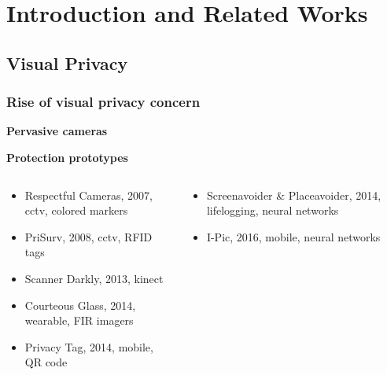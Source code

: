\section{Introduction and Related Works}

\subsection{Visual Privacy}
\begin{frame}[t]
\frametitle{Rise of visual privacy concern}

\begin{block}{\bf Pervasive cameras}
\end{block}

\begin{block}{\bf Protection prototypes}
  \tiny
  \begin{columns}[T]
    \begin{column}{0.5\textwidth}
  \begin{itemize}
      \item Respectful Cameras, 2007, cctv, colored markers
      \item PriSurv, 2008, cctv, RFID tags
      \item Scanner Darkly, 2013, kinect
      \item Courteous Glass, 2014, wearable, FIR imagers
      \item Privacy Tag, 2014, mobile, QR code
  \end{itemize}
    \end{column}\hfill
    \begin{column}{0.5\textwidth}
  \begin{itemize}
    \item Screenavoider \& Placeavoider, 2014, lifelogging, neural networks
    \item I-Pic, 2016, mobile, neural networks
  \end{itemize}
    \end{column}
  \end{columns}
\end{block}



\end{frame}
